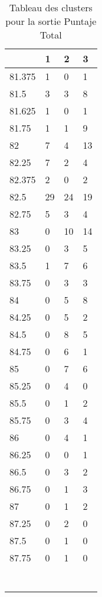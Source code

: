 \begin{table}[]
	\begin{tabular}{llll}
		& 1  & 2  & 3  \\
		\hline
		81.375 & 1  & 0  & 1  \\
		81.5   & 3  & 3  & 8  \\
		81.625 & 1  & 0  & 1  \\
		81.75  & 1  & 1  & 9  \\
		82     & 7  & 4  & 13 \\
		82.25  & 7  & 2  & 4  \\
		82.375 & 2  & 0  & 2  \\
		82.5   & 29 & 24 & 19 \\
		82.75  & 5  & 3  & 4  \\
		83     & 0  & 10 & 14 \\
		83.25  & 0  & 3  & 5  \\
		83.5   & 1  & 7  & 6  \\
		83.75  & 0  & 3  & 3  \\
		84     & 0  & 5  & 8  \\
		84.25  & 0  & 5  & 2  \\
		84.5   & 0  & 8  & 5  \\
		84.75  & 0  & 6  & 1  \\
		85     & 0  & 7  & 6  \\
		85.25  & 0  & 4  & 0  \\
		85.5   & 0  & 1  & 2  \\
		85.75  & 0  & 3  & 4  \\
		86     & 0  & 4  & 1  \\
		86.25  & 0  & 0  & 1  \\
		86.5   & 0  & 3  & 2  \\
		86.75  & 0  & 1  & 3  \\
		87     & 0  & 1  & 2  \\
		87.25  & 0  & 2  & 0  \\
		87.5   & 0  & 1  & 0  \\
		87.75  & 0  & 1  & 0 \\
		&&&  \\
		&&&  \\
		&&&  \\
		&&&  \\
		&&&  \\
		&&&  \\
		&&&  
	\end{tabular}
\caption{Tableau des clusters pour la sortie Puntaje Total}

\end{table}


